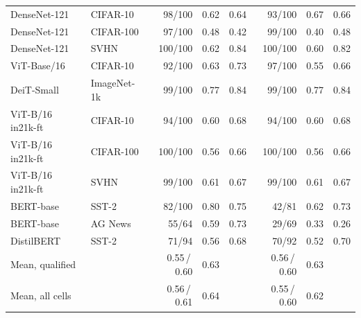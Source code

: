 \begin{table}[t]
{\begin{tabular}{ll rcc rcc}
DenseNet-121 & CIFAR-10 & 98/100 & 0.62 & 0.64 & 93/100 & 0.67 & 0.66 \\
DenseNet-121 & CIFAR-100 & 97/100 & 0.48 & 0.42 & 99/100 & 0.40 & 0.48 \\
DenseNet-121 & SVHN & 100/100 & 0.62 & 0.84 & 100/100 & 0.60 & 0.82 \\
ViT-Base/16 & CIFAR-10 & 92/100 & 0.63 & 0.73 & 97/100 & 0.55 & 0.66 \\
DeiT-Small & ImageNet-1k & 99/100 & 0.77 & 0.84 & 99/100 & 0.77 & 0.84 \\
ViT-B/16 in21k-ft & CIFAR-10 & 94/100 & 0.60 & 0.68 & 94/100 & 0.60 & 0.68 \\
ViT-B/16 in21k-ft & CIFAR-100 & 100/100 & 0.56 & 0.66 & 100/100 & 0.56 & 0.66 \\
ViT-B/16 in21k-ft & SVHN & 99/100 & 0.61 & 0.67 & 99/100 & 0.61 & 0.67 \\
BERT-base & SST-2 & 82/100 & 0.80 & 0.75 & 42/81 & 0.62 & 0.73 \\
BERT-base & AG News & 55/64 & 0.59 & 0.73 & 29/69 & 0.33 & 0.26 \\
DistilBERT & SST-2 & 71/94 & 0.56 & 0.68 & 70/92 & 0.52 & 0.70 \\
\midrule
\multicolumn{2}{l}{Mean, qualified} & 0.55\,/\,0.60 & 0.63 & & 0.56\,/\,0.60 & 0.63 \\
\multicolumn{2}{l}{Mean, all cells} & 0.56\,/\,0.61 & 0.64 & & 0.55\,/\,0.60 & 0.62 \\
\bottomrule
\end{tabular}}\par

\end{table}
